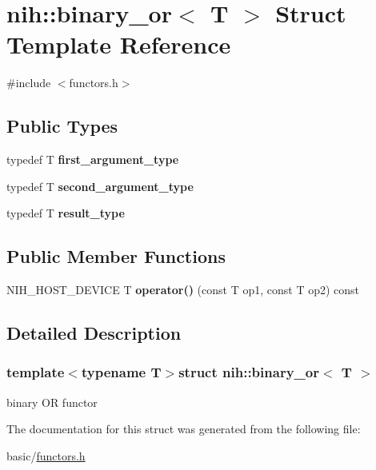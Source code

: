 \hypertarget{structnih_1_1binary__or}{
\section{nih\-:\-:binary\-\_\-or$<$ \-T $>$ \-Struct \-Template \-Reference}
\label{structnih_1_1binary__or}
}


{\ttfamily \#include $<$functors.\-h$>$}

\subsection*{\-Public \-Types}
\begin{DoxyCompactItemize}
\item 
\hypertarget{structnih_1_1binary__or_a2ad8e85de11ed333a0e4d4f5104e8096}{
typedef \-T {\bfseries first\-\_\-argument\-\_\-type}}
\label{structnih_1_1binary__or_a2ad8e85de11ed333a0e4d4f5104e8096}

\item 
\hypertarget{structnih_1_1binary__or_a4e58049960f38fa74a590f491a006125}{
typedef \-T {\bfseries second\-\_\-argument\-\_\-type}}
\label{structnih_1_1binary__or_a4e58049960f38fa74a590f491a006125}

\item 
\hypertarget{structnih_1_1binary__or_aac3c1a33d278c47774179ff49d1b9b5c}{
typedef \-T {\bfseries result\-\_\-type}}
\label{structnih_1_1binary__or_aac3c1a33d278c47774179ff49d1b9b5c}

\end{DoxyCompactItemize}
\subsection*{\-Public \-Member \-Functions}
\begin{DoxyCompactItemize}
\item 
\hypertarget{structnih_1_1binary__or_a6ee8dab1c1cbb72fe0f02304093017c0}{
\-N\-I\-H\-\_\-\-H\-O\-S\-T\-\_\-\-D\-E\-V\-I\-C\-E \-T {\bfseries operator()} (const \-T op1, const \-T op2) const }
\label{structnih_1_1binary__or_a6ee8dab1c1cbb72fe0f02304093017c0}

\end{DoxyCompactItemize}


\subsection{\-Detailed \-Description}
\subsubsection*{template$<$typename T$>$struct nih\-::binary\-\_\-or$<$ T $>$}

binary \-O\-R functor 

\-The documentation for this struct was generated from the following file\-:\begin{DoxyCompactItemize}
\item 
basic/\hyperlink{functors_8h}{functors.\-h}\end{DoxyCompactItemize}
